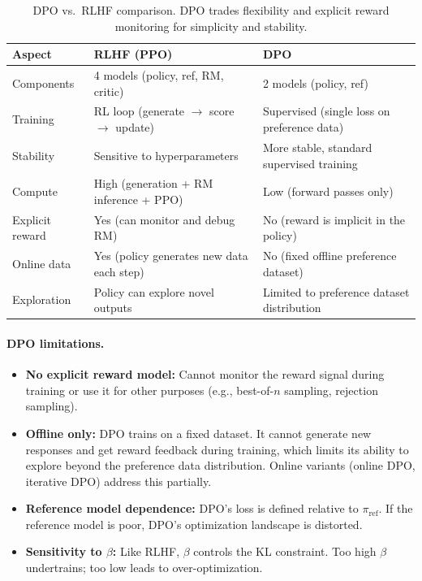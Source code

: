\begin{table}[H]
\centering
\begin{tabularx}{\textwidth}{lXX}
\toprule
\textbf{Aspect} & \textbf{RLHF (PPO)} & \textbf{DPO} \\
\midrule
Components & 4 models (policy, ref, RM, critic) & 2 models (policy, ref) \\
Training & RL loop (generate $\to$ score $\to$ update) & Supervised (single loss on preference data) \\
Stability & Sensitive to hyperparameters & More stable, standard supervised training \\
Compute & High (generation + RM inference + PPO) & Low (forward passes only) \\
Explicit reward & Yes (can monitor and debug RM) & No (reward is implicit in the policy) \\
Online data & Yes (policy generates new data each step) & No (fixed offline preference dataset) \\
Exploration & Policy can explore novel outputs & Limited to preference dataset distribution \\
\bottomrule
\end{tabularx}
\caption{DPO vs.\ RLHF comparison.  DPO trades flexibility and explicit
reward monitoring for simplicity and stability.}
\label{tab:dpo_vs_rlhf}
\end{table}

\paragraph{DPO limitations.}
\begin{itemize}[leftmargin=*]
\item \textbf{No explicit reward model:} Cannot monitor the reward signal
  during training or use it for other purposes (e.g., best-of-$n$
  sampling, rejection sampling).
\item \textbf{Offline only:} DPO trains on a fixed dataset.  It cannot
  generate new responses and get reward feedback during training, which
  limits its ability to explore beyond the preference data distribution.
  Online variants (online DPO, iterative DPO) address this partially.
\item \textbf{Reference model dependence:} DPO's loss is defined relative
  to $\pi_{\text{ref}}$.  If the reference model is poor, DPO's
  optimization landscape is distorted.
\item \textbf{Sensitivity to $\beta$:} Like RLHF, $\beta$ controls the
  KL constraint.  Too high $\beta$ undertrains; too low leads to
  over-optimization.
\end{itemize}



